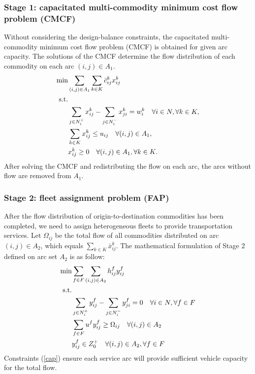 \documentclass[11pt,nonblindrev,fleqn]{article}
\begin{document}
\subsubsection{Stage 1: capacitated multi-commodity minimum cost flow problem (CMCF)}
Without considering the design-balance constraints, the capacitated multi-commodity minimum cost flow problem (CMCF) is obtained for given arc capacity. The solutions of the CMCF  determine the flow distribution of each commodity on each arc $(i,j)\in A_1$.
\begin{align}
   \min& \sum_{(i,j)\in A_1}\sum_{k\in K} \bar{c}_{ij}^k x_{ij}^k     \\
   \rm{s.t.} & \nonumber \\
         &  \sum_{j\in N_i^+}x_{ij}^k - \sum_{j\in N_i^-}x_{ji}^k = w_i^k     \quad      \forall i\in N, \forall k\in K,  \\
         &  \sum_{k\in K} x_{ij}^k \leq u_{ij}      \quad    \forall (i,j)\in A_1,  \\
        &  x_{ij}^k \geq 0   \quad    \forall (i,j)\in A_1, \forall k\in K.
\end{align}
After solving the CMCF and redistributing the flow on each arc, the arcs without flow are removed from $A_1$.

\subsubsection{Stage 2: fleet assignment problem (FAP)}
After the flow distribution of origin-to-destination commodities has been completed, we need to assign heterogeneous fleets to provide transportation services. Let $\Omega_{ij}$ be the total flow of all commodities distributed on arc $(i,j) \in A_2$, which equals $\sum_{k\in K}\bar{x}_{ij}^k$. The mathematical formulation of Stage 2 defined on arc set $A_2$ is as follow:
\begin{align}
  \min & \sum_{f\in F}\sum_{(i,j)\in A_2} h_{ij}^f y_{ij}^f \\
    \rm{s.t.} & \nonumber \\
     & \sum_{j\in N_i^+}y_{ij}^f - \sum_{j\in N_i^-}y_{ji}^f = 0     \quad      \forall i\in N,\forall f\in F  \\
     & \sum_{f\in F} u^f y_{ij}^f \geq \Omega_{ij}      \quad       \forall (i,j)\in A_2   \label{cap} \\
     & y_{ij}^f \in Z_0^+       \quad       \forall (i,j)\in A_2, \forall f\in F
\end{align}
Constraints (\ref{cap}) ensure each service arc will provide sufficient vehicle capacity for the total flow.
\end{document}
